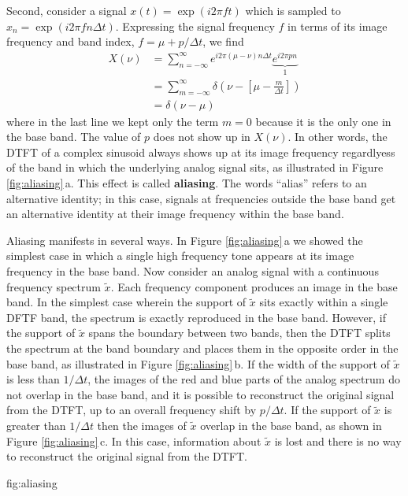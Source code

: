 Second, consider a signal $x(t) = \exp(i 2 \pi f t)$ which is sampled to $x_n = \exp( i 2 \pi f n \Delta t)$.
Expressing the signal frequency $f$ in terms of its image frequency and band index, $f= \mu + p/\Delta t$, we find
\begin{align}
X(\nu)
&= \sum_{n=-\infty}^\infty e^{i 2 \pi (\mu - \nu) n \Delta t} \underbrace{e^{i 2 \pi p n}}_1 \nonumber \\
&= \sum_{m=-\infty}^\infty \delta \left(\nu - \left[ \mu - \frac{m}{\Delta t} \right] \right) \nonumber \\
&= \delta(\nu - \mu)
\end{align}
where in the last line we kept only the term $m=0$ because it is the only one in the base band.
The value of $p$ does not show up in $X(\nu)$.
In other words, the DTFT of a complex sinusoid always shows up at its image frequency regardlyess of the band in which the underlying analog signal sits, as illustrated in Figure \ref{fig:aliasing}\,a.
This effect is called \textbf{aliasing}.
The words ``alias'' refers to an alternative identity; in this case, signals at frequencies outside the base band get an alternative identity at their image frequency within the base band.

Aliasing manifests in several ways.
In Figure \ref{fig:aliasing}\,a we showed the simplest case in which a single high frequency tone appears at its image frequency in the base band.
Now consider an analog signal with a continuous frequency spectrum $\tilde{x}$.
Each frequency component produces an image in the base band.
In the simplest case wherein the support of $\tilde{x}$ sits exactly within a single DFTF band, the spectrum is exactly reproduced in the base band.
However, if the support of $\tilde{x}$ spans the boundary between two bands, then the DTFT splits the spectrum at the band boundary and places them in the opposite order in the base band, as illustrated in Figure \ref{fig:aliasing}\,b.
If the width of the support of $\tilde{x}$ is less than $1/\Delta t$, the images of the red and blue parts of the analog spectrum do not overlap in the base band, and it is possible to reconstruct the original signal from the DTFT, up to an overall frequency shift by $p/\Delta t$.
If the support of $\tilde{x}$ is greater than $1/\Delta t$ then the images of $\tilde{x}$ overlap in the base band, as shown in Figure \ref{fig:aliasing}\,c.
In this case, information about $\tilde{x}$ is lost and there is no way to reconstruct the original signal from the DTFT.

{fig:aliasing}

